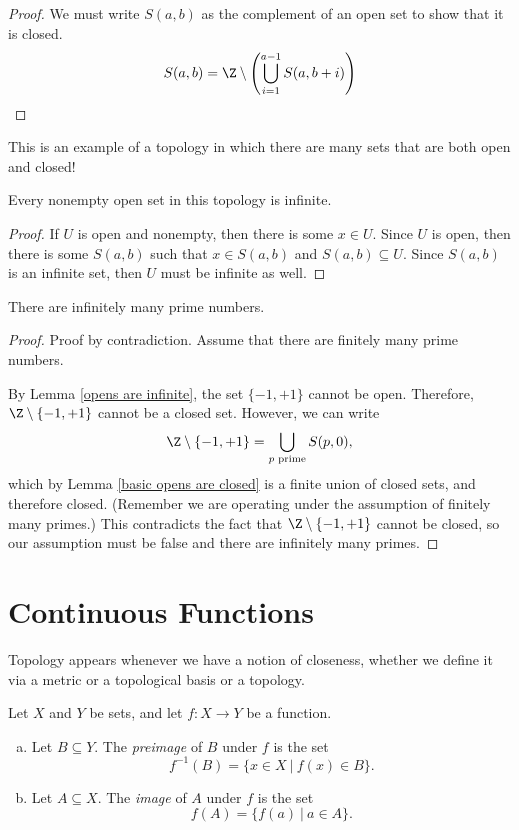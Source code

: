 \documentclass[noname]{notes}
\begin{document}
\begin{proof}
	We must write $S(a,b)$ as the complement of an open set to show that it is closed. 
	\[
		S(a,b) = \Z \setminus \left(\bigcup_{i = 1}^{a-1} S(a,b+i)\right)
	\]
\end{proof}

This is an example of a topology in which there are many sets that are both open and closed! 

\begin{lemma}
	\label{opens are infinite}
	Every nonempty open set in this topology is infinite. 
\end{lemma}

\begin{proof}
	If $U$ is open and nonempty, then there is some $x \in U$. Since $U$ is open, then there is some $S(a,b)$ such that $x \in S(a,b)$ and $S(a,b)\subseteq U$. Since $S(a,b)$ is an infinite set, then $U$ must be infinite as well. 
\end{proof}

\begin{theorem}
	There are infinitely many prime numbers. 
\end{theorem}

\begin{proof}
	Proof by contradiction. Assume that there are finitely many prime numbers. 

	By Lemma \cref{opens are infinite}, the set $\{-1,+1\}$ cannot be open. Therefore, $\Z \setminus \{-1, +1\}$ cannot be a closed set. However, we can write
	\[
		\Z \setminus \{-1, +1\} = \bigcup_{p \text{ prime}} S(p,0),
	\]
	which by Lemma \cref{basic opens are closed} is a finite union of closed sets, and therefore closed. (Remember we are operating under the assumption of finitely many primes.) This contradicts the fact that $\Z \setminus \{-1, +1\}$ cannot be closed, so our assumption must be false and there are infinitely many primes. 
\end{proof}


\section{Continuous Functions}

Topology appears whenever we have a notion of closeness, whether we define it via a metric or a topological basis or a topology. 

\begin{definition}
	Let $X$ and $Y$ be sets, and let $f \colon X \to Y$ be a function. 
	\begin{enumerate}[(a)]
		\item Let $B \subseteq Y$. The \emph{preimage} of $B$ under $f$ is the set 
		\[	
			f^{-1}(B) = \Big\{x \in X \ \Big\vert\ f(x) \in B\Big\}. 
		\]
		\item Let $A \subseteq X$. The \emph{image} of $A$ under $f$ is the set 
		\[
			f(A) = \Big\{f(a) \ \Big\vert\ a \in A\Big\}. 
		\]
	\end{enumerate}
\end{definition}
\end{document}
